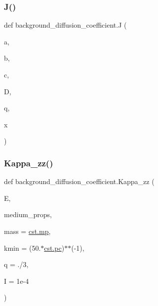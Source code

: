 \mbox{\label{namespacebackground__diffusion__coefficient_a751d44e9536ec7a83b768e7829c8ea95}} 
\subsubsection{\texorpdfstring{J()}{J()}}
{\footnotesize\ttfamily def background\+\_\+diffusion\+\_\+coefficient.\+J (\begin{DoxyParamCaption}\item[{}]{a,  }\item[{}]{b,  }\item[{}]{c,  }\item[{}]{D,  }\item[{}]{q,  }\item[{}]{x }\end{DoxyParamCaption})}

\mbox{\label{namespacebackground__diffusion__coefficient_a90de23556ff1b6647c805b26e421a00f}} 
\subsubsection{\texorpdfstring{Kappa\+\_\+zz()}{Kappa\_zz()}}
{\footnotesize\ttfamily def background\+\_\+diffusion\+\_\+coefficient.\+Kappa\+\_\+zz (\begin{DoxyParamCaption}\item[{}]{E,  }\item[{}]{medium\+\_\+props,  }\item[{}]{mass = {\ttfamily \hyperlink{constants_8h_a6b331c08a80ed71d31c55a3341776483}{cst.\+mp}},  }\item[{}]{kmin = {\ttfamily (50.$\ast$\hyperlink{constants_8h_a2884cd030c4c825754349a525a1d06ce}{cst.\+pc})$\ast$$\ast$(-\/1)},  }\item[{}]{q = {./3},  }\item[{}]{I = {\ttfamily 1e-\/4} }\end{DoxyParamCaption})}

